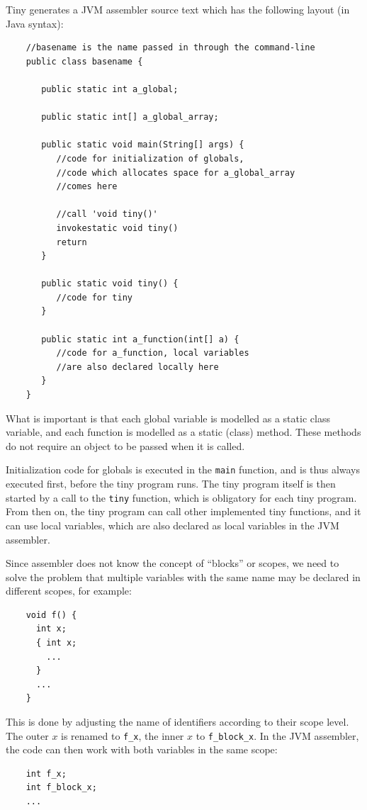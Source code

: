 \documentclass[a4paper]{article}
\begin{document}
Tiny generates a JVM assembler source text which has the
following layout (in Java syntax):
\begin{verbatim}
    //basename is the name passed in through the command-line
    public class basename {

       public static int a_global;

       public static int[] a_global_array;

       public static void main(String[] args) {
          //code for initialization of globals,
          //code which allocates space for a_global_array
          //comes here

          //call 'void tiny()'
          invokestatic void tiny()
          return
       }

       public static void tiny() {
          //code for tiny
       }

       public static int a_function(int[] a) {
          //code for a_function, local variables
          //are also declared locally here
       }
    }
\end{verbatim}

What is important is that each global variable is modelled as a static class
variable, and each function is modelled as a static (class) method. These methods
do not require an object to be passed when it is called.

Initialization code for globals is executed in the \texttt{main} function, and
is thus always executed first, before the tiny program runs. The tiny program
itself is then started by a call to the \texttt{tiny} function, which is
obligatory for each tiny program. From then on, the tiny program can call
other implemented tiny functions, and it can use local variables, which are
also declared as local variables in the JVM assembler.

Since assembler does not know the concept of ``blocks'' or scopes, we need to
solve the problem that multiple variables with the same name may be declared
in different scopes, for example:\\
\begin{verbatim}
    void f() {
      int x;
      { int x;
        ...
      }
      ...
    }
\end{verbatim}

This is done by adjusting the name of identifiers according to their scope
level. The outer $x$ is renamed to \texttt{f\_x}, the inner $x$ to
\texttt{f\_block\_x}. In the JVM assembler, the code can then work with
both variables in the same scope:
\begin{verbatim}
    int f_x;
    int f_block_x;
    ...
\end{verbatim}
\end{document}
